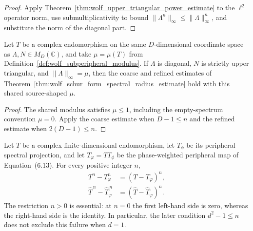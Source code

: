 \begin{proof}
    \leanok
    Apply Theorem~\ref{thm:wolf_upper_triangular_power_estimate} to the
    $\ell^2$ operator norm, use submultiplicativity to bound
    $\lVert\Lambda^n\rVert_\infty\le\lVert\Lambda\rVert_\infty^n$, and
    substitute the norm of the diagonal part.
\end{proof}

\begin{corollary}
    \label{cor:wolf_schur_form_subperipheral_modulus}
    \leanok
    Let $T$ be a complex endomorphism on the same $D$-dimensional coordinate
    space as $\Lambda,N\in M_D(\mathbb C)$, and take
    $\mu=\mu(T)$ from Definition~\ref{def:wolf_subperipheral_modulus}.
    If $\Lambda$ is diagonal, $N$ is strictly upper triangular, and
    $\lVert\Lambda\rVert_\infty=\mu$, then the coarse and refined estimates of
    Theorem~\ref{thm:wolf_schur_form_spectral_radius_estimate} hold with this
    shared source-shaped $\mu$.
\end{corollary}

\begin{proof}
    \leanok
    The shared modulus satisfies $\mu\le1$, including the empty-spectrum
    convention $\mu=0$.  Apply the coarse estimate when $D-1\le n$ and the
    refined estimate when $2(D-1)\le n$.
\end{proof}

\begin{lemma}
    \label{lem:wolf_positive_power_nonperipheral_identity}
    \leanok
    Let $T$ be a complex finite-dimensional endomorphism, let $T_\phi$ be
    its peripheral spectral projection, and let
    $T_\varphi=T T_\phi$ be the phase-weighted peripheral map of
    Equation~(6.13).  For every positive integer $n$,
    \begin{align}
      T^n-T_\varphi^n&=(T-T_\varphi)^n,\\
      \widehat T^{\,n}-\widehat T_\varphi^{\,n}
        &=(\widehat T-\widehat T_\varphi)^n.
    \end{align}
    The restriction $n>0$ is essential: at $n=0$ the first left-hand side
    is zero, whereas the right-hand side is the identity.  In particular,
    the later condition $d^2-1\leq n$ does not exclude this failure when
    $d=1$.
\end{lemma}

